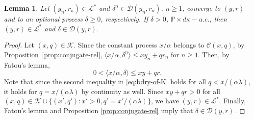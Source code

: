 \documentclass[11pt, oneside]{article}   	%
\theoremstyle{plain}
\newtheorem{lem}[thm]{Lemma}
\theoremstyle{definition}
\theoremstyle{remark}
\begin{document}
\begin{lem}\label{lem:limit-in-dual}
Let $(y_n,r_n)\in\mathcal{L}^*$ and $\delta^n\in\mathcal{D}(y_n,r_n)$, $n\geq 1$, converge to $(y,r)$ and to an optional process $\delta\geq 0$, respectively. If $\delta>0$, $\mathbb{P}\times d\kappa-$a.e., then $(y,r)\in\mathcal{L}^*$ and $\delta\in\mathcal{D}(y,r)$.
\end{lem}
\begin{proof}
Let $(x,q)\in\mathcal{K}$. Since the constant process $x/\alpha$ belongs to $\mathcal{C}(x,q)$, by Proposition~\ref{prop:conjugate-rel}, $\langle x/\alpha,\delta^n\rangle \leq xy_n+qr_n$ for $n\geq1$. Then, by Fatou's lemma,
\begin{equation}\label{eq:bdry-of-K}
0<\langle x/\alpha,\delta\rangle\leq xy+qr.
\end{equation}
Note that since the second inequality in \eqref{eq:bdry-of-K} holds for all $q<x/(\alpha\lambda)$, it holds for $q=x/(\alpha\lambda)$ by continuity as well. Since $xy+qr>0$ for all $(x,q)\in\mathcal{K}\cup\{(x',q'):x'>0, q'=x'/(\alpha\lambda)\}$, we have $(y,r)\in\mathcal{L}^*.$ Finally, Fatou's lemma and Proposition \ref{prop:conjugate-rel} imply that $\delta\in\mathcal{D}(y,r)$.
\end{proof}
\end{document}
